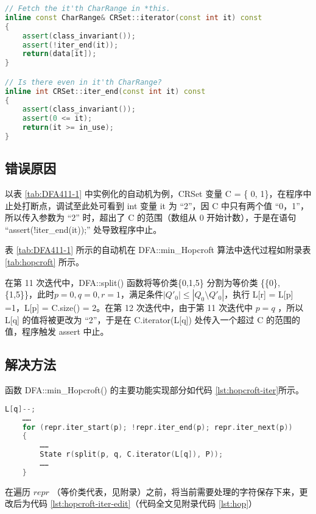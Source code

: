 \begin{lstlisting}[language=C++,label={lst:iterend},caption={ CRSet.h },firstnumber=142]
// Fetch the it'th CharRange in *this.
inline const CharRange& CRSet::iterator(const int it) const
{
    assert(class_invariant());
    assert(!iter_end(it));
    return(data[it]);
}

// Is there even in it'th CharRange?
inline int CRSet::iter_end(const int it) const
{
    assert(class_invariant());
    assert(0 <= it);
    return(it >= in_use);
}
\end{lstlisting}

\subsection{错误原因}

以表 \ref{tab:DFA411-1} 中实例化的自动机为例，CRSet 变量 C = \{ 0, 1\}，在程序中止处打断点，调试至此处可看到 int 变量 it 为 “2”，因 C 中只有两个值 “0，1”，所以传入参数为 “2” 时，超出了 C 的范围（数组从 0 开始计数），于是在语句 “assert(!iter\_end(it));” 处导致程序中止。

表 \ref{tab:DFA411-1} 所示的自动机在 DFA::min\_Hopcroft 算法中迭代过程如附录表 \ref{tab:hopcroft} 所示。

在第 11 次迭代中，DFA::split() 函数将等价类\{0,1,5\} 分割为等价类 \{\{0\},\{1,5\}\}，此时$p=0,q=0,r=1$，满足条件$|Q'_0| \leq | Q_0 \setminus Q'_0 |$，执行 L[r] = L[p] =1，L[p] = C.size() = 2。在第 12 次迭代中，由于第 11 次迭代中 $p=q$ ，所以 L[q] 的值将被更改为 “2”，于是在 C.iterator(L[q]) 处传入一个超过 C 的范围的值，程序触发 assert 中止。

\subsection{解决方法}

函数 DFA::min\_Hopcroft() 的主要功能实现部分如代码 \ref{lst:hopcroft-iter}所示。

\begin{lstlisting}[language=C++,label={lst:hopcroft-iter},caption={ min-hop.cpp },firstnumber=68]
    L[q]--;
    ……
    for (repr.iter_start(p); !repr.iter_end(p); repr.iter_next(p))
    {
        ……
        State r(split(p, q, C.iterator(L[q]), P));
        ……
    }
\end{lstlisting}

在遍历 $repr$ （等价类代表，见附录）之前，将当前需要处理的字符保存下来，更改后为代码 \ref{lst:hopcroft-iter-edit}（代码全文见附录代码 \ref{lst:hop}）

